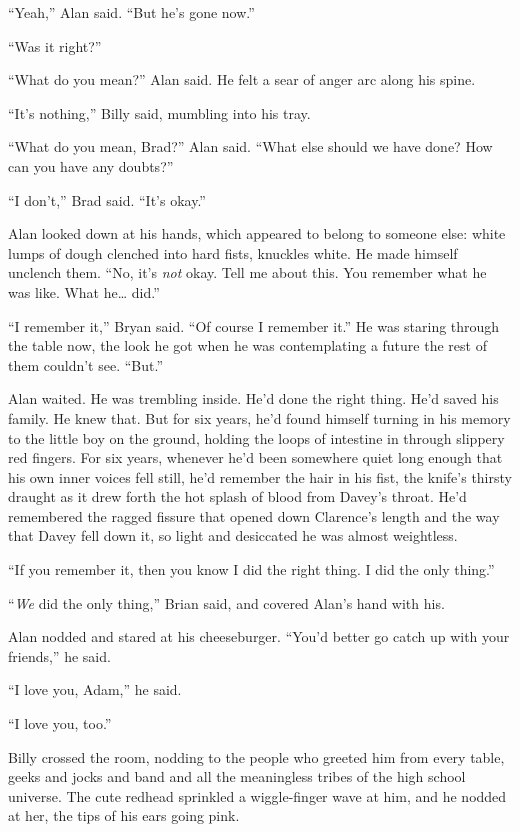 ``Yeah,'' Alan said.  ``But he's gone now.''

``Was it right?''

``What do you mean?'' Alan said.  He felt a sear of anger arc along
his spine.

``It's nothing,'' Billy said, mumbling into his tray.

``What do you mean, Brad?'' Alan said.  ``What else should we have
done?  How can you have any doubts?''

``I don't,'' Brad said.  ``It's okay.''

Alan looked down at his hands, which appeared to belong to someone
else:  white lumps of dough clenched into hard fists, knuckles white. 
He made himself unclench them.  ``No, it's \textit{not} okay.  Tell me
about this.  You remember what he was like.  What he\ldots{}  did.''

``I remember it,'' Bryan said.  ``Of course I remember it.'' He was
staring through the table now, the look he got when he was
contemplating a future the rest of them couldn't see.  ``But.''

Alan waited.  He was trembling inside.  He'd done the right thing. 
He'd saved his family.  He knew that.  But for six years, he'd found
himself turning in his memory to the little boy on the ground, holding
the loops of intestine in through slippery red fingers.  For six
years, whenever he'd been somewhere quiet long enough that his own
inner voices fell still, he'd remember the hair in his fist, the
knife's thirsty draught as it drew forth the hot splash of blood from
Davey's throat.  He'd remembered the ragged fissure that opened down
Clarence's length and the way that Davey fell down it, so light and
desiccated he was almost weightless.

``If you remember it, then you know I did the right thing.  I did the
only thing.''

``\textit{We} did the only thing,'' Brian said, and covered Alan's
hand with his.

Alan nodded and stared at his cheeseburger.  ``You'd better go catch
up with your friends,'' he said.

``I love you, Adam,'' he said.

``I love you, too.''

Billy crossed the room, nodding to the people who greeted him from
every table, geeks and jocks and band and all the meaningless tribes
of the high school universe.  The cute redhead sprinkled a
wiggle-finger wave at him, and he nodded at her, the tips of his ears
going pink.


